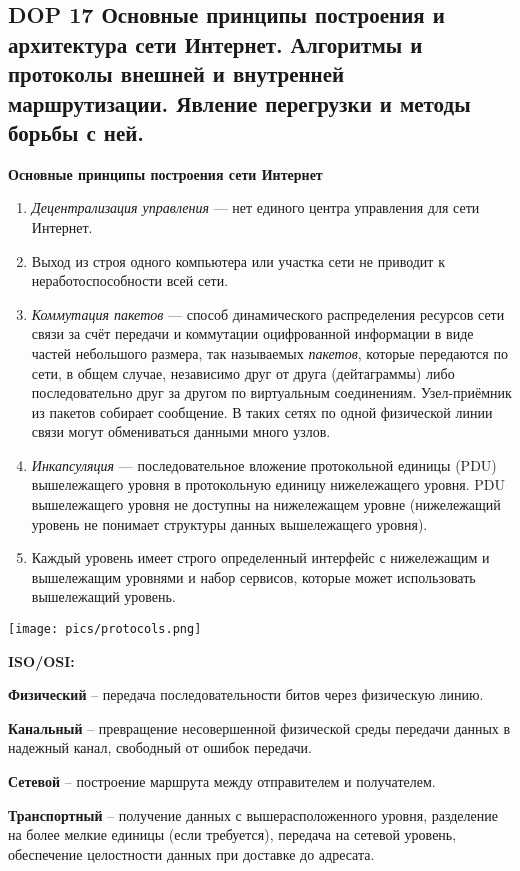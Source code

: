 \subsection{DOP 17 Основные  принципы  построения  и  архитектура  сети  Интернет.  Алгоритмы  и  протоколы  внешней  и внутренней маршрутизации. Явление перегрузки и методы борьбы с ней.}

\textbf{Основные принципы построения сети Интернет}

\begin{enumerate}
    \item \textit{Децентрализация управления} --- нет единого центра управления для сети Интернет.
    \item Выход из строя одного компьютера или участка сети не приводит к неработоспособности всей сети.
    \item \textit{Коммутация пакетов} --- способ динамического распределения ресурсов сети связи за счёт передачи и коммутации оцифрованной информации в виде частей небольшого размера, так называемых \textit{пакетов}, которые передаются по сети, в общем случае, независимо друг от друга (дейтаграммы) либо последовательно друг за другом по виртуальным соединениям.
    Узел-приёмник из пакетов собирает сообщение.
    В таких сетях по одной физической линии связи могут обмениваться данными много узлов.
    \item \textit{Инкапсуляция} --- последовательное вложение протокольной единицы (PDU) вышележащего уровня в протокольную единицу нижележащего уровня.
    PDU вышележащего уровня не доступны на нижележащем уровне (нижележащий уровень не понимает структуры данных вышележащего уровня).
    \item Каждый уровень имеет строго определенный интерфейс с нижележащим и вышележащим уровнями и набор сервисов, которые может использовать вышележащий уровень.
\end{enumerate}

\bigbreak
\texttt{[image: pics/protocols.png]}

\textbf{ISO/OSI:}

\textbf{Физический} -- передача последовательности битов через физическую линию.

\textbf{Канальный} -- превращение несовершенной физической среды передачи данных в надежный канал, свободный от ошибок передачи.

\textbf{Сетевой} -- построение маршрута между отправителем и получателем.

\textbf{Транспортный} -- получение данных с вышерасположенного уровня, разделение на более мелкие единицы (если требуется), передача на сетевой уровень, обеспечение целостности данных при доставке до адресата.

